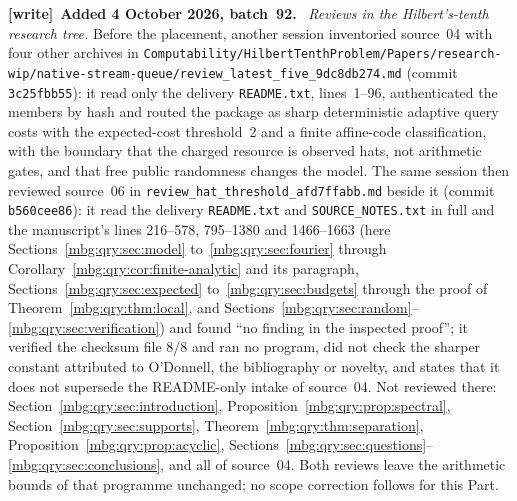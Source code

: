 \documentclass[11pt,letterpaper]{article}
\theoremstyle{definition}
\newenvironment{writenote}[1][]{\par\smallskip\begingroup\small
 \noindent\textbf{[write]}\if\relax\detokenize{#1}\relax\else~\textbf{#1.}\fi\ }%
 {\par\endgroup\smallskip}
\begin{document}
\begin{writenote}[Added 4 October 2026, batch~92]
\emph{Reviews in the Hilbert's-tenth research tree.} Before the placement, another session inventoried source~04 with four other archives in \nolinkurl{Computability/HilbertTenthProblem/Papers/research-wip/native-stream-queue/review_latest_five_9dc8db274.md} (commit \texttt{3c25fbb55}): it read only the delivery \texttt{README.txt}, lines~1--96, authenticated the members by hash and routed the package as sharp deterministic adaptive query costs with the expected-cost threshold~2 and a finite affine-code classification, with the boundary that the charged resource is observed hats, not arithmetic gates, and that free public randomness changes the model. The same session then reviewed source~06 in \nolinkurl{review_hat_threshold_afd7ffabb.md} beside it (commit \texttt{b560cee86}): it read the delivery \texttt{README.txt} and \texttt{SOURCE\_\allowbreak NOTES.txt} in full and the manuscript's lines 216--578, 795--1380 and 1466--1663 (here Sections~\ref{mbg:qry:sec:model} to~\ref{mbg:qry:sec:fourier} through Corollary~\ref{mbg:qry:cor:finite-analytic} and its paragraph, Sections~\ref{mbg:qry:sec:expected} to~\ref{mbg:qry:sec:budgets} through the proof of Theorem~\ref{mbg:qry:thm:local}, and Sections~\ref{mbg:qry:sec:random}--\ref{mbg:qry:sec:verification}) and found ``no finding in the inspected proof''; it verified the checksum file 8/8 and ran no program, did not check the sharper constant attributed to O'Donnell, the bibliography or novelty, and states that it does not supersede the README-only intake of source~04. Not reviewed there: Section~\ref{mbg:qry:sec:introduction}, Proposition~\ref{mbg:qry:prop:spectral}, Section~\ref{mbg:qry:sec:supports}, Theorem~\ref{mbg:qry:thm:separation}, Proposition~\ref{mbg:qry:prop:acyclic}, Sections~\ref{mbg:qry:sec:questions}--\ref{mbg:qry:sec:conclusions}, and all of source~04. Both reviews leave the arithmetic bounds of that programme unchanged; no scope correction follows for this Part.


\end{writenote}
\end{document}
